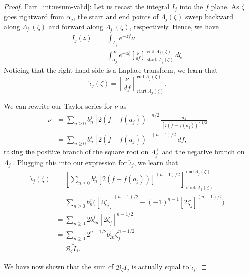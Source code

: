 \documentclass{article}
\theoremstyle{definition}
\newcommand{\borel}{\mathcal{B}}
\begin{document}
\begin{proof}
Part~\eqref{int:resum-valid}: Let us recast the integral $I_j$ into the $f$ plane. As $\zeta$ goes rightward from $\alpha_j$, the start and end points of $\Lambda_j(\zeta)$ sweep backward along $\Lambda^-_j(\zeta)$ and forward along $\Lambda^+_j(\zeta)$, respectively. Hence, we have
\begin{align*}
I_j(z) & = \int_{\Lambda_j} e^{-zf} \nu \\
& = \int_{\alpha_j}^\infty e^{-z\zeta} \left[\frac{\nu}{df}\right]_{\operatorname{start} \Lambda_j(\zeta)}^{\operatorname{end} \Lambda_j(\zeta)}\,d\zeta.
\end{align*}
Noticing that the right-hand side is a Laplace transform, we learn that
\begin{equation}\label{thimble-difference}
\hat{\iota}_j(\zeta) = \left[\frac{\nu}{df}\right]_{\operatorname{start} \Lambda_j(\zeta)}^{\operatorname{end} \Lambda_j(\zeta)}.
\end{equation}

We can rewrite our Taylor series for $\nu$ as
\begin{align*}
\nu & = \sum_{n \ge 0} b_n^j [2(f - f(a_j))]^{n/2}\,\frac{df}{[2(f - f(a_j))]^{1/2}} \\
& = \sum_{n \ge 0} b_n^j [2(f - f(a_j))]^{(n - 1)/2}\,df,
\end{align*}
taking the positive branch of the square root on $\Lambda^+_j$ and the negative branch on $\Lambda^-_j$. Plugging this into our expression for $\hat{\iota}_j$, we learn that
\begin{align*}
\hat{\iota}_j(\zeta) & = \left[ \sum_{n \ge 0} b_n^j [2(f - f(a_j))]^{(n - 1)/2} \right]_{\operatorname{start} \Lambda_j(\zeta)}^{\operatorname{end} \Lambda_j(\zeta)} \\
& = \sum_{n \ge 0} b_n^j \Big( [2\zeta_j]^{(n - 1)/2} - (-1)^{n-1}[2\zeta_j]^{(n - 1)/2} \Big) \\
& = \sum_{n \ge 0} 2 b_{2n}^j [2\zeta_j]^{n - 1/2} \\
& = \sum_{n \ge 0} 2^{n+1/2} b_{2n}^j \zeta_j^{n - 1/2} \\
& = \borel_{\zeta} \tilde{I}_j.
\end{align*}

We have now shown that the sum of $\borel_{\zeta} \tilde{I}_j$ is actually equal to $\hat{\iota}_j$.


\end{proof}
\end{document}
